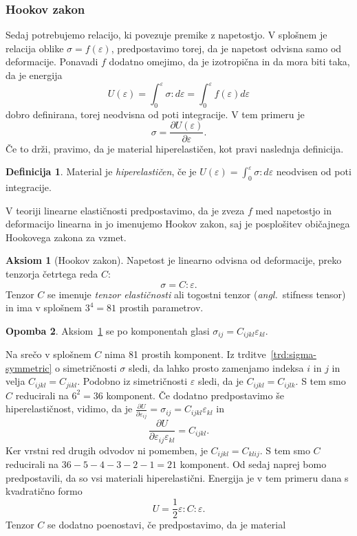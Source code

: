 \documentclass[a4paper,twoside]{article}
\theoremstyle{definition} %
\newtheorem{definicija}{Definicija}[section]
\newtheorem{opomba}[definicija]{Opomba}
\newtheorem{aksiom}{Aksiom}
\theoremstyle{plain} %
\numberwithin{equation}{section}
\newcommand{\eps}{\varepsilon}
\newcommand{\dpar}[2]{\ensuremath{\frac{\partial #1}{\partial #2}}}
\newcommand{\ts}{\sigma}
\newcommand{\ang}[1]{(\textit{angl.}\ #1)}
\begin{document}
\subsubsection{Hookov zakon}
Sedaj potrebujemo relacijo, ki povezuje premike z napetostjo.
V splošnem je relacija oblike $\ts = f(\eps)$, predpostavimo torej, da je
napetost odvisna samo od deformacije. Ponavadi $f$ dodatno omejimo, da je
izotropična in da mora biti taka, da je energija
\[
  U(\eps) = \int_{0}^{\eps} \ts : d\eps = \int_0^\eps f(\eps) d\eps
\]
dobro definirana, torej neodvisna od poti integracije. V tem primeru je
\[
  \ts = \dpar{U(\eps)}{\eps}.
\]
Če to drži, pravimo, da je material hiperelastičen, kot pravi naslednja
definicija.
\begin{definicija}
  Material je \emph{hiperelastičen}, če je $U(\eps) = \int_0^\eps \ts:d\eps$ neodvisen
  od poti integracije.
\end{definicija}
V teoriji linearne elastičnosti
predpostavimo, da je zveza $f$ med napetostjo in deformacijo linearna in jo
imenujemo Hookov zakon, saj je posplošitev običajnega Hookovega zakona za vzmet.
\begin{aksiom}[Hookov zakon]
  \label{aks:hook}
  Napetost je linearno odvisna od deformacije, preko tenzorja četrtega reda $C$:
  \[ \ts = C:\eps. \]
  Tenzor $C$ se imenuje \emph{tenzor elastičnosti} ali togostni tenzor
  \ang{stifness tensor} in ima v splošnem $3^4 = 81$ prostih parametrov.
\end{aksiom}
\begin{opomba}
  Aksiom~\ref{aks:hook} se po komponentah glasi $\ts_{ij} = C_{ijkl}
  \eps_{kl}$.
\end{opomba}
Na srečo v splošnem $C$ nima 81 prostih komponent.
Iz trditve~\ref{trd:sigma-symmetric} o simetričnosti $\ts$ sledi, da lahko
prosto zamenjamo indeksa $i$ in $j$ in velja $C_{ijkl} = C_{jikl}$.
Podobno iz simetričnosti $\eps$ sledi, da je $C_{ijkl} = C_{ijlk}$.
S tem smo $C$ reducirali na $6^2 = 36$ komponent.
Če dodatno predpostavimo še hiperelastičnost, vidimo, da je $\dpar{U}{\eps_{ij}}
= \sigma_{ij} = C_{ijkl}\eps_{kl}$ in
\[
  \dpar{U}{\eps_{ij}\eps_{kl}} = C_{ijkl}.
\]
Ker vrstni red drugih odvodov ni pomemben, je $C_{ijkl} = C_{klij}$.
S tem smo $C$ reducirali na $36-5-4-3-2-1 = 21$ komponent.
Od sedaj naprej bomo predpostavili, da so vsi materiali hiperelastični.
Energija je v tem primeru dana s kvadratično formo
\begin{equation}
  U = \frac12 \eps:C:\eps.
  \label{eq:energy}
\end{equation}
Tenzor $C$ se dodatno poenostavi, če predpostavimo, da je material
\end{document}
